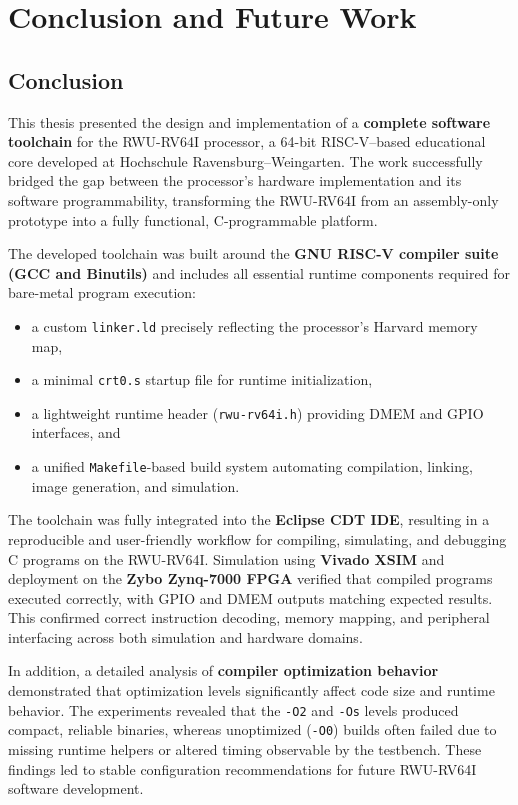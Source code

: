 \chapter{Conclusion and Future Work}
\label{ch:conclusion}

\section{Conclusion}

This thesis presented the design and implementation of a \textbf{complete software toolchain} for the RWU-RV64I processor, a 64-bit RISC-V–based educational core developed at Hochschule Ravensburg–Weingarten.  
The work successfully bridged the gap between the processor’s hardware implementation and its software programmability, transforming the RWU-RV64I from an assembly-only prototype into a fully functional, C-programmable platform.

The developed toolchain was built around the \textbf{GNU RISC-V compiler suite (GCC and Binutils)} and includes all essential runtime components required for bare-metal program execution:
\begin{itemize}
    \item a custom \texttt{linker.ld} precisely reflecting the processor’s Harvard memory map,
    \item a minimal \texttt{crt0.s} startup file for runtime initialization,
    \item a lightweight runtime header (\texttt{rwu-rv64i.h}) providing DMEM and GPIO interfaces, and
    \item a unified \texttt{Makefile}-based build system automating compilation, linking, image generation, and simulation.
\end{itemize}

The toolchain was fully integrated into the \textbf{Eclipse CDT IDE}, resulting in a reproducible and user-friendly workflow for compiling, simulating, and debugging C programs on the RWU-RV64I.  
Simulation using \textbf{Vivado XSIM} and deployment on the \textbf{Zybo Zynq-7000 FPGA} verified that compiled programs executed correctly, with GPIO and DMEM outputs matching expected results.  
This confirmed correct instruction decoding, memory mapping, and peripheral interfacing across both simulation and hardware domains.

In addition, a detailed analysis of \textbf{compiler optimization behavior} demonstrated that optimization levels significantly affect code size and runtime behavior.  
The experiments revealed that the \texttt{-O2} and \texttt{-Os} levels produced compact, reliable binaries, whereas unoptimized (\texttt{-O0}) builds often failed due to missing runtime helpers or altered timing observable by the testbench.  
These findings led to stable configuration recommendations for future RWU-RV64I software development.

